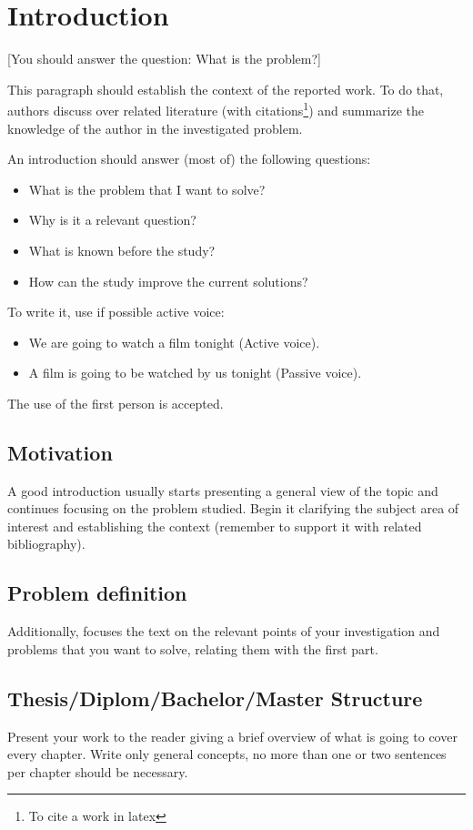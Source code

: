 \chapter{Introduction}

[You should answer the question: What is the problem?]

This paragraph should establish the context of the reported work. To do that, authors discuss over related literature (with citations\footnote{To cite a work in latex  }) and summarize the knowledge of the author in the investigated problem.

An introduction should answer (most of) the following questions:
\begin{itemize}
	\item What is the problem that I want to solve?
	\item Why is it a relevant question?
	\item What is known before the study?
	\item How can the study improve the current solutions?
\end{itemize}

To write it, use if possible active voice:
\begin{itemize}
	\item We are going to watch a film tonight (Active voice).
	\item A film is going to be watched by us tonight (Passive voice).
\end{itemize}
The use of the first person is accepted.





\section{Motivation}

A good introduction usually starts presenting a general view of the topic and continues focusing on the problem studied. Begin it clarifying the subject area of interest and establishing the context (remember to support it with related bibliography).



\section{Problem definition}
Additionally, focuses the text on the relevant points of your investigation and problems that you want to solve, relating them with the first part.




\section{Thesis/Diplom/Bachelor/Master Structure}
Present your work to the reader giving a brief overview of what is going to cover every chapter. Write only general concepts, no more than one or two sentences per chapter should be necessary. 
